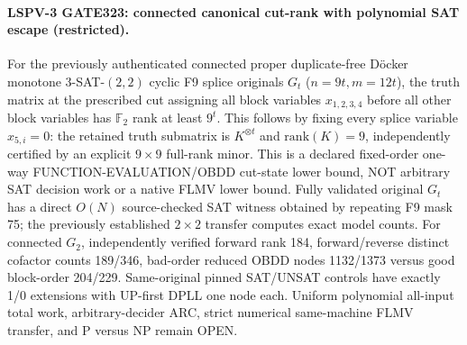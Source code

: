 \paragraph{LSPV-3 GATE323: connected canonical cut-rank with polynomial SAT escape (restricted).}
For the previously authenticated connected proper duplicate-free D\"ocker monotone $3$-SAT-$(2,2)$ cyclic F9 splice originals $G_t$ ($n=9t,m=12t$), the truth matrix at the prescribed cut assigning all block variables $x_{1,2,3,4}$ before all other block variables has $\mathbb F_2$ rank at least $9^t$. This follows by fixing every splice variable $x_{5,i}=0$: the retained truth submatrix is $K^{\otimes t}$ and $\mathrm{rank}(K)=9$, independently certified by an explicit $9\times9$ full-rank minor. This is a declared fixed-order one-way FUNCTION-EVALUATION/OBDD cut-state lower bound, NOT arbitrary SAT decision work or a native FLMV lower bound. Fully validated original $G_t$ has a direct $O(N)$ source-checked SAT witness obtained by repeating F9 mask 75; the previously established $2\times2$ transfer computes exact model counts. For connected $G_2$, independently verified forward rank 184, forward/reverse distinct cofactor counts 189/346, bad-order reduced OBDD nodes 1132/1373 versus good block-order 204/229. Same-original pinned SAT/UNSAT controls have exactly 1/0 extensions with UP-first DPLL one node each. Uniform polynomial all-input total work, arbitrary-decider ARC, strict numerical same-machine FLMV transfer, and P versus NP remain OPEN.
